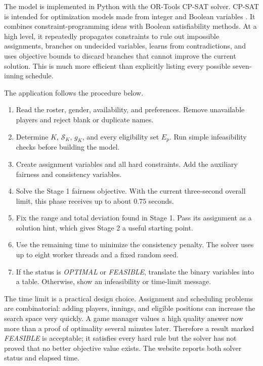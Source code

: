 \documentclass[11pt]{article}
\begin{document}
The model is implemented in Python with the OR-Tools CP-SAT solver. CP-SAT is
intended for optimization models made from integer and Boolean variables
\cite{ortools}. It combines constraint-programming ideas with Boolean
satisfiability methods. At a high level, it repeatedly propagates constraints
to rule out impossible assignments, branches on undecided variables, learns
from contradictions, and uses objective bounds to discard branches that
cannot improve the current solution. This is much more efficient than
explicitly listing every possible seven-inning schedule.

The application follows the procedure below.
\begin{enumerate}
    \item Read the roster, gender, availability, and preferences. Remove
    unavailable players and reject blank or duplicate names.
    \item Determine $K$, $\mathcal{S}_K$, $g_K$, and every eligibility set
    $E_p$. Run simple infeasibility checks before building the model.
    \item Create assignment variables and all hard constraints. Add the
    auxiliary fairness and consistency variables.
    \item Solve the Stage 1 fairness objective. With the current three-second
    overall limit, this phase receives up to about $0.75$ seconds.
    \item Fix the range and total deviation found in Stage 1. Pass its
    assignment as a solution hint, which gives Stage 2 a useful starting
    point.
    \item Use the remaining time to minimize the consistency penalty. The
    solver uses up to eight worker threads and a fixed random seed.
    \item If the status is \emph{OPTIMAL} or \emph{FEASIBLE}, translate the
    binary variables into a table. Otherwise, show an infeasibility or
    time-limit message.
\end{enumerate}

The time limit is a practical design choice. Assignment and scheduling
problems are combinatorial: adding players, innings, and eligible positions
can increase the search space very quickly. A game manager values a high
quality answer now more than a proof of optimality several minutes later.
Therefore a result marked \emph{FEASIBLE} is acceptable; it satisfies every
hard rule but the solver has not proved that no better objective value exists.
The website reports both solver status and elapsed time.
\end{document}
